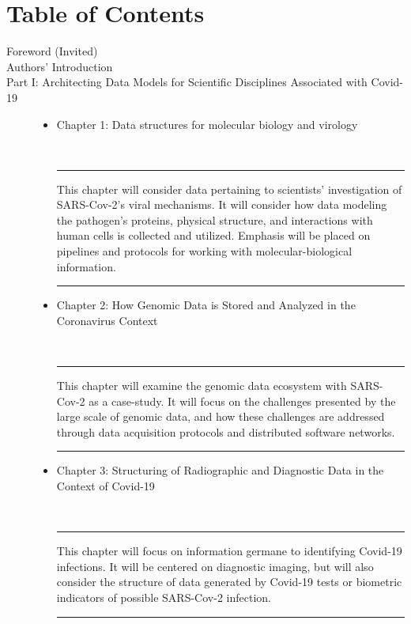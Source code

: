 \documentclass{statsoc}
\newenvironment{summary}{\\\vspace{-4pt}%
%
%
\noindent\hfil\textcolor{rgrey!50!purple}{\rule{0.5\textwidth}{.4pt}}\hfil

\hspace{-2cm}\begin{minipage}{1.02\textwidth}\fontfamily{phv}\fontsize{9}{11}\selectfont}%
{\\\vspace{-1em}\end{minipage}
{\begin{center}\textcolor{rgrey!50!yellow}{\rule{0.5\textwidth}{.4pt}}\end{center}}
\vspace{2em}}%
\begin{document}
{\section{Table of Contents}

\begin{description}

\item[Foreword (Invited)]

\item[Authors' Introduction]

\item[Part I: Architecting Data Models for Scientific Disciplines Associated with Covid-19]

\begin{itemize}
\item Chapter 1: Data structures for molecular biology and virology

\begin{summary}
This chapter will consider data pertaining to scientists' 
investigation of SARS-Cov-2's viral mechanisms.  It will 
consider how data modeling the pathogen's proteins, 
physical structure, and interactions with human cells 
is collected and utilized.  Emphasis will be placed 
on  pipelines and protocols for 
working with molecular-biological information.   
\end{summary}

\item Chapter 2: How Genomic Data is Stored and Analyzed in the Coronavirus Context

\begin{summary}
This chapter will examine the genomic data ecosystem with SARS-Cov-2 
as a case-study.  It will focus on the challenges presented 
by the large scale of genomic data, and how these challenges 
are addressed through data acquisition protocols and 
distributed software networks. 
\end{summary}

\item Chapter 3: Structuring of Radiographic and Diagnostic Data in the Context of Covid-19

\begin{summary}
This chapter will focus on information germane to identifying Covid-19 infections.  
It will be centered on diagnostic imaging, but will also consider 
the structure of data generated by Covid-19 tests or 
biometric indicators of possible SARS-Cov-2 infection.
\end{summary}


\end{itemize}
\end{description}}
\end{document}
